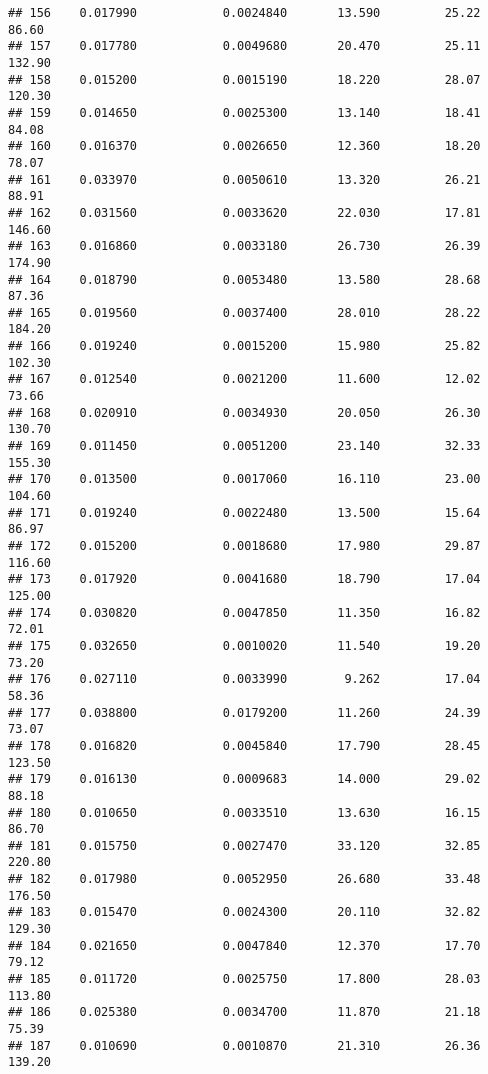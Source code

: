 \documentclass[
]{article}
\begin{document}
\begin{verbatim}
## 156    0.017990            0.0024840       13.590         25.22           86.60
## 157    0.017780            0.0049680       20.470         25.11          132.90
## 158    0.015200            0.0015190       18.220         28.07          120.30
## 159    0.014650            0.0025300       13.140         18.41           84.08
## 160    0.016370            0.0026650       12.360         18.20           78.07
## 161    0.033970            0.0050610       13.320         26.21           88.91
## 162    0.031560            0.0033620       22.030         17.81          146.60
## 163    0.016860            0.0033180       26.730         26.39          174.90
## 164    0.018790            0.0053480       13.580         28.68           87.36
## 165    0.019560            0.0037400       28.010         28.22          184.20
## 166    0.019240            0.0015200       15.980         25.82          102.30
## 167    0.012540            0.0021200       11.600         12.02           73.66
## 168    0.020910            0.0034930       20.050         26.30          130.70
## 169    0.011450            0.0051200       23.140         32.33          155.30
## 170    0.013500            0.0017060       16.110         23.00          104.60
## 171    0.019240            0.0022480       13.500         15.64           86.97
## 172    0.015200            0.0018680       17.980         29.87          116.60
## 173    0.017920            0.0041680       18.790         17.04          125.00
## 174    0.030820            0.0047850       11.350         16.82           72.01
## 175    0.032650            0.0010020       11.540         19.20           73.20
## 176    0.027110            0.0033990        9.262         17.04           58.36
## 177    0.038800            0.0179200       11.260         24.39           73.07
## 178    0.016820            0.0045840       17.790         28.45          123.50
## 179    0.016130            0.0009683       14.000         29.02           88.18
## 180    0.010650            0.0033510       13.630         16.15           86.70
## 181    0.015750            0.0027470       33.120         32.85          220.80
## 182    0.017980            0.0052950       26.680         33.48          176.50
## 183    0.015470            0.0024300       20.110         32.82          129.30
## 184    0.021650            0.0047840       12.370         17.70           79.12
## 185    0.011720            0.0025750       17.800         28.03          113.80
## 186    0.025380            0.0034700       11.870         21.18           75.39
## 187    0.010690            0.0010870       21.310         26.36          139.20

\end{verbatim}
\end{document}
